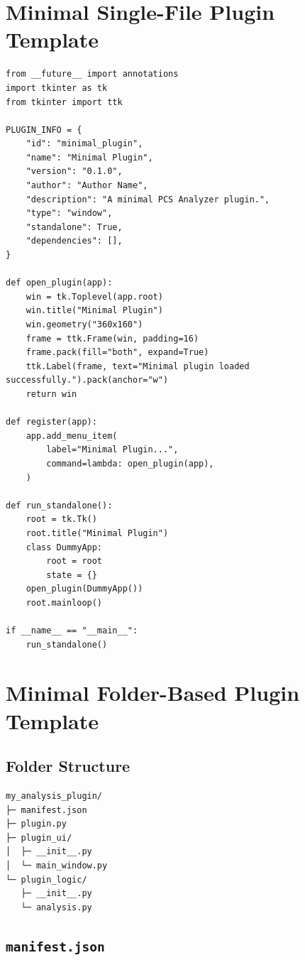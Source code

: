 \documentclass[11pt, a4paper]{article}
\begin{document}
\section{Minimal Single-File Plugin Template}

\begin{lstlisting}[style=python]
from __future__ import annotations
import tkinter as tk
from tkinter import ttk

PLUGIN_INFO = {
    "id": "minimal_plugin",
    "name": "Minimal Plugin",
    "version": "0.1.0",
    "author": "Author Name",
    "description": "A minimal PCS Analyzer plugin.",
    "type": "window",
    "standalone": True,
    "dependencies": [],
}

def open_plugin(app):
    win = tk.Toplevel(app.root)
    win.title("Minimal Plugin")
    win.geometry("360x160")
    frame = ttk.Frame(win, padding=16)
    frame.pack(fill="both", expand=True)
    ttk.Label(frame, text="Minimal plugin loaded successfully.").pack(anchor="w")
    return win

def register(app):
    app.add_menu_item(
        label="Minimal Plugin...",
        command=lambda: open_plugin(app),
    )

def run_standalone():
    root = tk.Tk()
    root.title("Minimal Plugin")
    class DummyApp:
        root = root
        state = {}
    open_plugin(DummyApp())
    root.mainloop()

if __name__ == "__main__":
    run_standalone()
\end{lstlisting}

\section{Minimal Folder-Based Plugin Template}

\subsection{Folder Structure}

\begin{lstlisting}[style=text]
my_analysis_plugin/
├─ manifest.json
├─ plugin.py
├─ plugin_ui/
│  ├─ __init__.py
│  └─ main_window.py
└─ plugin_logic/
   ├─ __init__.py
   └─ analysis.py
\end{lstlisting}

\subsection{\texttt{manifest.json}}
\end{document}
